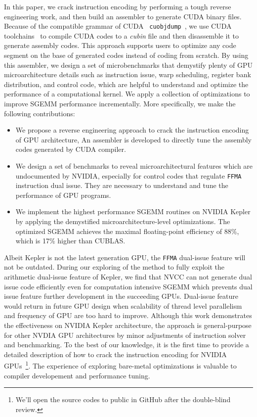 In this paper, we crack instruction encoding by performing a tough reverse engineering work, and then build an 
assembler to generate CUDA binary files. Because of the compatible grammar of CUDA {\tt 
cuobjdump}~\cite{cubin2015util}, we use CUDA toolchains~\cite{nvcc} to compile CUDA codes to a {\em cubin} file and 
then disassemble it to generate assembly codes. This approach supports users to optimize any code segment on the base 
of generated codes instead of coding from scratch. By using this assembler, we design a set of microbenchmarks that 
demystify plenty of GPU microarchitecture details such as instruction issue, warp scheduling, register bank distribution, 
and control code, which are helpful to understand and optimize the performance of a computational kernel. We apply a collection of 
optimizations to improve SGEMM performance incrementally. More specifically, we make the following contributions:
\begin{itemize}
\item We propose a reverse engineering approach to crack the instruction encoding of GPU architecture,
An assembler is developed to directly tune the assembly codes generated by CUDA compiler.
\item We design a set of benchmarks to reveal microarchitectural features which are undocumented by NVIDIA, 
especially for control codes that regulate {\tt FFMA} instruction dual issue.
They are necessary to understand and tune the performance of GPU programs.
\item We implement the highest performance SGEMM routines on NVIDIA Kepler by applying the demystified 
microarchitecture-level optimizations. The optimized SGEMM achieves the maximal floating-point efficiency of 88\%, 
which is 17\% higher than CUBLAS.
\end{itemize}

Albeit Kepler is not the latest generation GPU, the {\tt FFMA} dual-issue feature will not be
outdated. During our exploring of the method to fully exploit the arithmetic
dual-issue feature of Kepler, we find that NVCC can not generate dual issue code efficiently even for computation
intensive SGEMM which prevents dual issue feature further development in the succeeding GPUs. Dual-issue feature would return in future
GPU design when scalability of thread level parallelism and frequency of GPU are too hard to improve.
Although this work demonstrates the effectiveness on NVIDIA Kepler architecture, the approach is general-purpose for 
other NVDIA GPU architectures by minor adjustments of instruction solver and benchmarking. To the best of our 
knowledge, it is the first time to provide a detailed description of how to crack the instruction encoding for NVIDIA 
GPUs~\footnote{We'll open the source codes to public in GitHub after the double-blind review.}. The experience of 
exploring bare-metal optimizations is valuable to compiler developement and performance tuning.

